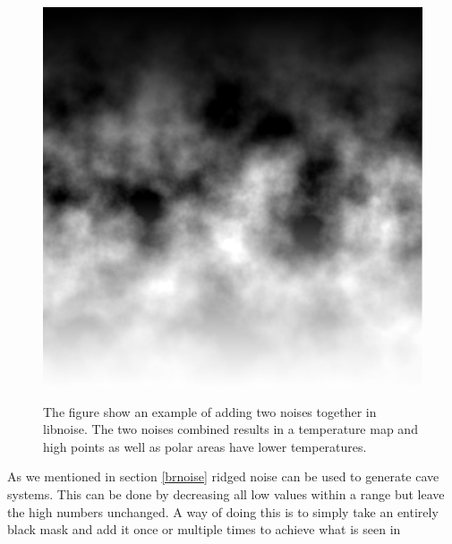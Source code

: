 \begin{figure}[H]
\begin{minipage}[b]{.32\linewidth}
		\label{fig:5b}
	\end{minipage}
	\begin{minipage}[b]{.32\linewidth}
		\includegraphics[width=0.95\linewidth]{img/Temperature}
		\label{fig:5c}
	\end{minipage}
	\centering
	\caption{The figure show an example of adding two noises together in libnoise. The two noises combined results in a temperature map and high points as well as polar areas have lower temperatures.}
	\label{fig:Temperature}
\end{figure}

As we mentioned in section \ref{brnoise} ridged noise can be used to generate cave systems. This can be done by decreasing all low values within a range but leave the high numbers unchanged. A way of doing this is to simply take an entirely black mask and add it once or multiple times to achieve what is seen in 


